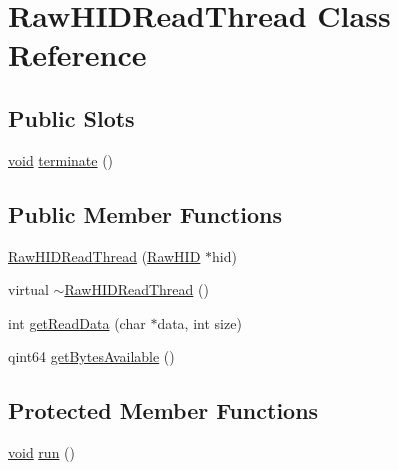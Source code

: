 \hypertarget{class_raw_h_i_d_read_thread}{\section{\-Raw\-H\-I\-D\-Read\-Thread \-Class \-Reference}
\label{class_raw_h_i_d_read_thread}
}
\subsection*{\-Public \-Slots}
\begin{DoxyCompactItemize}
\item 
\hyperlink{group___u_a_v_objects_plugin_ga444cf2ff3f0ecbe028adce838d373f5c}{void} \hyperlink{group___raw_h_i_d_plugin_ga9a2b05a16852317c6f30aa1171b4e605}{terminate} ()
\end{DoxyCompactItemize}
\subsection*{\-Public \-Member \-Functions}
\begin{DoxyCompactItemize}
\item 
\hyperlink{group___raw_h_i_d_plugin_ga4a906f373d862e82a9c6972a5144a9ce}{\-Raw\-H\-I\-D\-Read\-Thread} (\hyperlink{class_raw_h_i_d}{\-Raw\-H\-I\-D} $\ast$hid)
\item 
virtual \hyperlink{group___raw_h_i_d_plugin_ga39a7dfe6227270e9721fb326ed792805}{$\sim$\-Raw\-H\-I\-D\-Read\-Thread} ()
\item 
int \hyperlink{group___raw_h_i_d_plugin_gaa619bfb605e0c07b6a33147d451490cb}{get\-Read\-Data} (char $\ast$data, int size)
\item 
qint64 \hyperlink{group___raw_h_i_d_plugin_ga7a009b110ddd862add0a221ad4072e75}{get\-Bytes\-Available} ()
\end{DoxyCompactItemize}
\subsection*{\-Protected \-Member \-Functions}
\begin{DoxyCompactItemize}
\item 
\hyperlink{group___u_a_v_objects_plugin_ga444cf2ff3f0ecbe028adce838d373f5c}{void} \hyperlink{group___raw_h_i_d_plugin_ga1f533b47a0fb6382c542a4fa5b344d2a}{run} ()
\end{DoxyCompactItemize}
